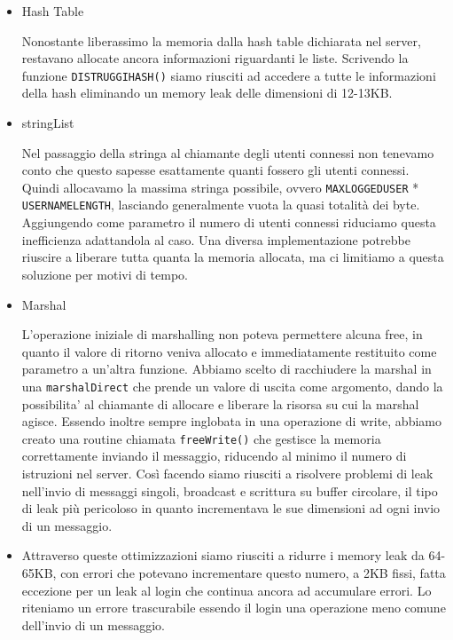 \documentclass[a4paper, 11pt]{article} %
\begin{document}
\begin{itemize}
	\item Hash Table\\
	\footnotesize
	
	\normalsize
	Nonostante liberassimo la memoria dalla hash table dichiarata nel server, restavano allocate ancora informazioni riguardanti le liste. Scrivendo la funzione \texttt{DISTRUGGIHASH()} siamo riusciti ad accedere a tutte le informazioni della hash eliminando un memory leak delle dimensioni di 12-13KB.\\
	\item stringList\\
	\footnotesize
	
	\normalsize
	Nel passaggio della stringa al chiamante degli utenti connessi non tenevamo conto che questo sapesse esattamente quanti fossero gli utenti connessi. Quindi allocavamo la massima stringa possibile, ovvero \texttt{MAXLOGGEDUSER} *  \texttt{USERNAMELENGTH}, lasciando generalmente vuota la quasi totalità dei byte. Aggiungendo come parametro il numero di utenti connessi riduciamo questa inefficienza adattandola al caso. Una diversa implementazione potrebbe riuscire a liberare tutta quanta la memoria allocata, ma ci limitiamo a questa soluzione per motivi di tempo.
	\item Marshal\\
	\footnotesize
	
	
	
	\normalsize
	L'operazione iniziale di marshalling non poteva permettere alcuna free, in quanto il valore di ritorno veniva allocato e immediatamente restituito come parametro a un'altra funzione. Abbiamo scelto di racchiudere la marshal in una \texttt{marshalDirect} che prende un valore di uscita come argomento, dando la possibilita' al chiamante di allocare e liberare la risorsa su cui la marshal agisce. Essendo inoltre sempre inglobata in una operazione di write, abbiamo creato una routine chiamata \texttt{freeWrite()} che gestisce la memoria correttamente inviando il messaggio, riducendo al minimo il numero di istruzioni nel server. Così facendo siamo riusciti a risolvere problemi di leak nell'invio di messaggi singoli, broadcast e scrittura su buffer circolare, il tipo di leak più pericoloso in quanto incrementava le sue dimensioni ad ogni invio di un messaggio.
	\item
	Attraverso queste ottimizzazioni siamo riusciti a ridurre i memory leak da 64-65KB, con errori che potevano incrementare questo numero, a 2KB fissi, fatta eccezione per un leak al login che continua ancora ad accumulare errori. Lo riteniamo un errore trascurabile essendo il login una operazione meno comune dell'invio di un messaggio.
	
\end{itemize}
\end{document}
